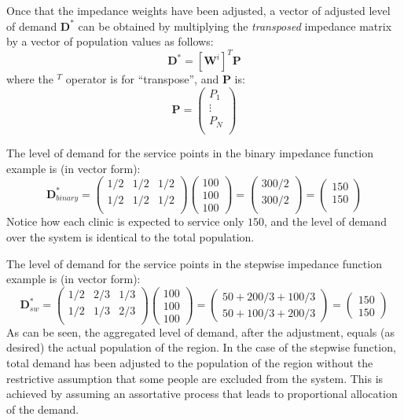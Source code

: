 \documentclass[10pt,letterpaper]{article}
\begin{document}
Once that the impedance weights have been adjusted, a vector of adjusted
level of demand \(\mathbf{D}^*\) can be obtained by multiplying the
\emph{transposed} impedance matrix by a vector of population values as
follows: \[
\mathbf{D}^* = [\mathbf{W}^{i}]^T\mathbf{P}
\] where the \(^T\) operator is for ``transpose'', and \(\mathbf{P}\)
is: \[
\mathbf{P} = \left(\begin{array}{c}
            P_1\\
            \vdots\\
            P_N\\
        \end{array}
        \right) 
\]

The level of demand for the service points in the binary impedance
function example is (in vector form): \[
\mathbf{D}^*_{binary}= \left( \begin{array}{ccc}
1/2 & 1/2 & 1/2\\
1/2 & 1/2 & 1/2\\
\end{array} \right)
\left( \begin{array}{c}
100\\
100\\
100
\end{array} \right)=
\left( \begin{array}{c}
300/2\\
300/2\\
\end{array} \right)=
\left( \begin{array}{c}
150\\
150\\
\end{array} \right)
\] Notice how each clinic is expected to service only \(150\), and the
level of demand over the system is identical to the total population.

The level of demand for the service points in the stepwise impedance
function example is (in vector form): \[
\mathbf{D}^*_{sw}= \left( \begin{array}{ccc}
1/2 & 2/3 & 1/3\\
1/2 & 1/3 & 2/3\\
\end{array} \right)
\left( \begin{array}{c}
100\\
100\\
100
\end{array} \right)=
\left( \begin{array}{c}
50 + 200/3 + 100/3\\
50 + 100/3 + 200/3
\end{array} \right)=
\left( \begin{array}{c}
150\\
150
\end{array} \right)
\] As can be seen, the aggregated level of demand, after the adjustment,
equals (as desired) the actual population of the region. In the case of
the stepwise function, total demand has been adjusted to the population
of the region without the restrictive assumption that some people are
excluded from the system. This is achieved by assuming an assortative
process that leads to proportional allocation of the demand.
\end{document}
